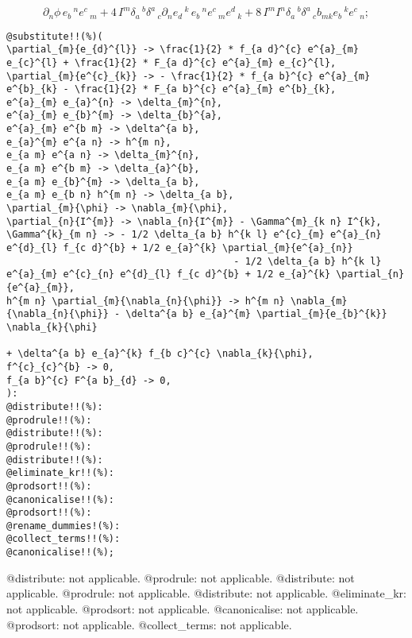 \documentclass[11pt]{article}
\begin{document}
\begin{dmath*}[compact, spread=2pt]
{\partial}_{n}{\phi}\,  {e}_{b}\,^{n} {e}^{c}\,_{m} + 4\, {I}^{m} {\delta}_{a}\,^{b} {\delta}^{a}\,_{c} {\partial}_{n}{{e}_{d}\,^{k}}\,  {e}_{b}\,^{n} {e}^{c}\,_{m} {e}^{d}\,_{k} + 8\, {I}^{m} {I}^{n} {\delta}_{a}\,^{b} {\delta}^{a}\,_{c} {b}_{m k} {e}_{b}\,^{k} {e}^{c}\,_{n};
\end{dmath*}
{\color[named]{Blue}\begin{verbatim}
@substitute!!(%)(
\partial_{m}{e_{d}^{l}} -> \frac{1}{2} * f_{a d}^{c} e^{a}_{m} e_{c}^{l} + \frac{1}{2} * F_{a d}^{c} e^{a}_{m} e_{c}^{l},
\partial_{m}{e^{c}_{k}} -> - \frac{1}{2} * f_{a b}^{c} e^{a}_{m} e^{b}_{k} - \frac{1}{2} * F_{a b}^{c} e^{a}_{m} e^{b}_{k},
e^{a}_{m} e_{a}^{n} -> \delta_{m}^{n},
e^{a}_{m} e_{b}^{m} -> \delta_{b}^{a},
e^{a}_{m} e^{b m} -> \delta^{a b},
e_{a}^{m} e^{a n} -> h^{m n},
e_{a m} e^{a n} -> \delta_{m}^{n},
e_{a m} e^{b m} -> \delta_{a}^{b},
e_{a m} e_{b}^{m} -> \delta_{a b},
e_{a m} e_{b n} h^{m n} -> \delta_{a b},
\partial_{m}{\phi} -> \nabla_{m}{\phi},
\partial_{n}{I^{m}} -> \nabla_{n}{I^{m}} - \Gamma^{m}_{k n} I^{k},
\Gamma^{k}_{m n} -> - 1/2 \delta_{a b} h^{k l} e^{c}_{m} e^{a}_{n} e^{d}_{l} f_{c d}^{b} + 1/2 e_{a}^{k} \partial_{m}{e^{a}_{n}} 
                                        - 1/2 \delta_{a b} h^{k l} e^{a}_{m} e^{c}_{n} e^{d}_{l} f_{c d}^{b} + 1/2 e_{a}^{k} \partial_{n}{e^{a}_{m}},
h^{m n} \partial_{m}{\nabla_{n}{\phi}} -> h^{m n} \nabla_{m}{\nabla_{n}{\phi}} - \delta^{a b} e_{a}^{m} \partial_{m}{e_{b}^{k}} \nabla_{k}{\phi} 
                                                                        + \delta^{a b} e_{a}^{k} f_{b c}^{c} \nabla_{k}{\phi},
f^{c}_{c}^{b} -> 0,
f_{a b}^{c} F^{a b}_{d} -> 0,
):
@distribute!!(%):
@prodrule!!(%):
@distribute!!(%):
@prodrule!!(%):
@distribute!!(%):
@eliminate_kr!!(%):
@prodsort!!(%):
@canonicalise!!(%):
@prodsort!!(%):
@rename_dummies!(%):
@collect_terms!!(%):
@canonicalise!!(%);
\end{verbatim}}
@distribute: not applicable.
@prodrule: not applicable.
@distribute: not applicable.
@prodrule: not applicable.
@distribute: not applicable.
@eliminate\_kr: not applicable.
@prodsort: not applicable.
@canonicalise: not applicable.
@prodsort: not applicable.
@collect\_terms: not applicable.
\end{document}
